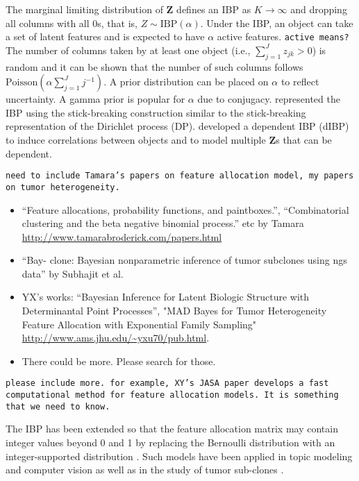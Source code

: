 \documentclass[12pt,]{article}
\def\Z{\bm{Z}}
\begin{document}
The marginal limiting distribution of $\Z$ defines an IBP as $K \rightarrow
\infty$ and dropping all columns with all 0s, that is,  \(Z \sim
\text{IBP}(\alpha)\). Under the IBP, an object can take a set of latent features and is expected to have  \(\alpha\)
active features.
%
{\tt active means?}
%
The number of columns taken by at least one object (i.e., $\sum_{j=1}^J z_{jk} >0$) is random
and it can be shown that the number of such columns follows
\(\text{Poisson}(\alpha \sum_{j=1}^J j^{-1})\).   A prior distribution can be
placed on \(\alpha\) to reflect uncertainty. A gamma prior is popular for
$\alpha$ due to conjugacy.  \cite{teh2007stick} represented the IBP using the
stick-breaking construction similar to the stick-breaking representation of the
Dirichlet process (DP).  \cite{williamson2010dependent} developed a dependent
IBP (dIBP) to induce correlations between objects and to model multiple
$\Z$s that can be dependent.

{\tt need to include Tamara's papers on feature allocation model, my papers on
  tumor heterogeneity. 

\begin{itemize}
\item ``Feature allocations, probability functions, and paintboxes.'',
  ``Combinatorial clustering and the beta negative binomial process.'' etc by
  Tamara \url{http://www.tamarabroderick.com/papers.html}

\item ``Bay- clone: Bayesian nonparametric inference of tumor subclones using
  ngs data'' by Subhajit et al.
 
\item YX's works: ``Bayesian Inference for Latent Biologic Structure with
  Determinantal Point Processes'', "MAD Bayes for Tumor Heterogeneity Feature
  Allocation with Exponential Family Sampling"
  \url{http://www.ams.jhu.edu/~yxu70/pub.html}.

\item There could be more.  Please search for those.
\end{itemize}
}

{\tt please include more. for example, XY's JASA paper develops a fast
computational method for feature allocation models.  It is something that we
need to know.  }

The IBP has been extended so that the feature allocation matrix may contain
integer values beyond 0 and 1 by replacing the Bernoulli distribution with an
integer-supported distribution \citep{broderick2013feature}. Such models have
been applied in topic modeling and computer vision
\cite{broderick2015combinatorial} as well as in the study of tumor sub-clones
\citep{sengupta2014bayclone}.
\end{document}
